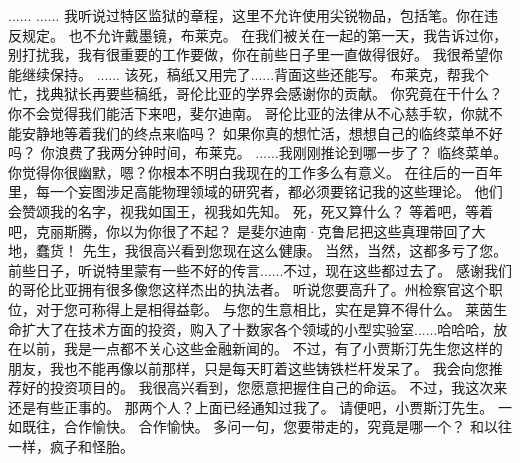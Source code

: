 \documentclass[openany]{book}
\begin{document}
\begin{dialogue}
     ......
     ......
     我听说过特区监狱的章程，这里不允许使用尖锐物品，包括笔。你在违反规定。
     也不允许戴墨镜，布莱克。
     在我们被关在一起的第一天，我告诉过你，别打扰我，我有很重要的工作要做，你在前些日子里一直做得很好。
     我很希望你能继续保持。
     ......
     该死，稿纸又用完了......背面这些还能写。
     布莱克，帮我个忙，找典狱长再要些稿纸，哥伦比亚的学界会感谢你的贡献。
     你究竟在干什么？
     你不会觉得我们能活下来吧，斐尔迪南。
     哥伦比亚的法律从不心慈手软，你就不能安静地等着我们的终点来临吗？
     如果你真的想忙活，想想自己的临终菜单不好吗？
     你浪费了我两分钟时间，布莱克。
     ......我刚刚推论到哪一步了？
     临终菜单。
     你觉得你很幽默，嗯？你根本不明白我现在的工作多么有意义。
     在往后的一百年里，每一个妄图涉足高能物理领域的研究者，都必须要铭记我的这些理论。
     他们会赞颂我的名字，视我如国王，视我如先知。
     死，死又算什么？
     等着吧，等着吧，克丽斯腾，你以为你很了不起？
     是斐尔迪南·克鲁尼把这些真理带回了大地，蠢货！
     先生，我很高兴看到您现在这么健康。
     当然，当然，这都多亏了您。
     前些日子，听说特里蒙有一些不好的传言......不过，现在这些都过去了。
     感谢我们的哥伦比亚拥有很多像您这样杰出的执法者。
     听说您要高升了。州检察官这个职位，对于您可称得上是相得益彰。
     与您的生意相比，实在是算不得什么。
     莱茵生命扩大了在技术方面的投资，购入了十数家各个领域的小型实验室......哈哈哈，放在以前，我是一点都不关心这些金融新闻的。
     不过，有了小贾斯汀先生您这样的朋友，我也不能再像以前那样，只是每天盯着这些铸铁栏杆发呆了。
     我会向您推荐好的投资项目的。
     我很高兴看到，您愿意把握住自己的命运。
     不过，我这次来还是有些正事的。
     那两个人？上面已经通知过我了。
     请便吧，小贾斯汀先生。
     一如既往，合作愉快。
     合作愉快。
     多问一句，您要带走的，究竟是哪一个？
     和以往一样，疯子和怪胎。
\end{dialogue}
\end{document}
